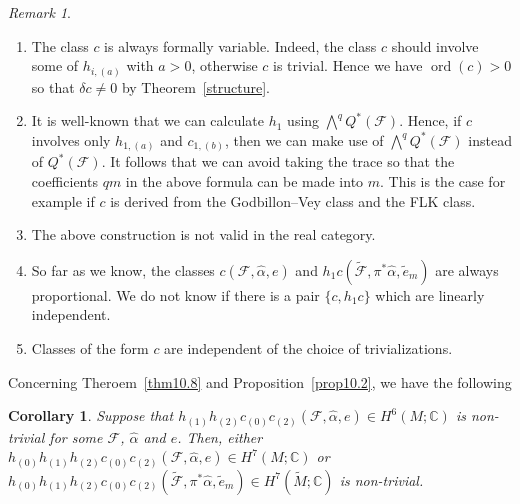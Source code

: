 \documentclass[12pt]{amsart}
\newcommand{\CF}{{\mathcal F}}
\newcommand{\C}{{\mathbb C}}
\DeclareMathOperator{\ord}{\mathrm{ord}}
\newcommand{\Wedge}{{\textstyle\bigwedge}}
\newtheorem{corollary}[theorem]{Corollary}
\theoremstyle{definition}
\theoremstyle{remark}
\newtheorem{remark}[theorem]{Remark}
\begin{document}
\begin{remark}
\begin{enumerate}
\item
The class $c$ is always formally variable.
Indeed, the class $c$ should involve some of $h_{i,(a)}$ with $a>0$, otherwise $c$ is trivial.
Hence we have $\ord(c)>0$ so that $\delta c\neq0$ by Theorem~\ref{structure}.
\item
It is well-known that we can calculate $h_1$ using $\Wedge^qQ^*(\CF)$.
Hence, if $c$ involves only $h_{1,(a)}$ and $c_{1,(b)}$, then we can make use of $\Wedge^qQ^*(\CF)$ instead of $Q^*(\CF)$.
It follows that we can avoid taking the trace so that the coefficients $qm$ in the above formula can be made into $m$.
This is the case for example if $c$ is derived from the Godbillon--Vey class and the FLK class.
\item
The above construction is not valid in the real category.
\item
So far as we know, the classes $c(\CF,\widehat\alpha,e)$ and $h_1c(\widetilde\CF,\pi^*\widehat\alpha,\widetilde{e}_m)$ are always proportional.
We do not know if there is a pair $\{c,h_1c\}$ which are linearly independent.
\item
Classes of the form $c$ are independent of the choice of trivializations.
\end{enumerate}
\end{remark}

Concerning Theroem~\ref{thm10.8} and Proposition~\ref{prop10.2}, we have the following

\begin{corollary}
Suppose that $h_{(1)}h_{(2)}c_{(0)}c_{(2)}(\CF,\widehat\alpha,e)\in H^6(M;\C)$ is non-trivial for some $\CF$, $\widehat{\alpha}$ and $e$.
Then, either $h_{(0)}h_{(1)}h_{(2)}c_{(0)}c_{(2)}(\CF,\widehat\alpha,e)\in H^7(M;\C)$ or\linebreak $h_{(0)}h_{(1)}h_{(2)}c_{(0)}c_{(2)}(\widetilde\CF,\pi^*\widehat\alpha,\widetilde{e}_m)\in H^7(\widetilde{M};\C)$ is non-trivial.
\end{corollary}
\end{document}

